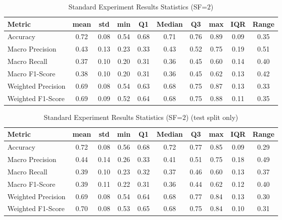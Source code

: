 \begin{table}[h]
\caption{Standard Experiment Results Statistics (SF=$2$)}
\label{tab:sf2_Standard_Results_Statistics}
\begin{tabular}{|l|c|c|c|c|c|c|c|c|c|}
\toprule
Metric & mean & std & min & Q1 & Median & Q3 & max & IQR & Range \\
\midrule
Accuracy & 0.72 & 0.08 & 0.54 & 0.68 & 0.71 & 0.76 & 0.89 & 0.09 & 0.35 \\
Macro Precision & 0.43 & 0.13 & 0.23 & 0.33 & 0.43 & 0.52 & 0.75 & 0.19 & 0.51 \\
Macro Recall & 0.37 & 0.10 & 0.20 & 0.31 & 0.36 & 0.45 & 0.60 & 0.14 & 0.40 \\
Macro F1-Score & 0.38 & 0.10 & 0.20 & 0.31 & 0.36 & 0.45 & 0.62 & 0.13 & 0.42 \\
Weighted Precision & 0.69 & 0.08 & 0.54 & 0.63 & 0.68 & 0.75 & 0.87 & 0.13 & 0.33 \\
Weighted F1-Score & 0.69 & 0.09 & 0.52 & 0.64 & 0.68 & 0.75 & 0.88 & 0.11 & 0.35 \\
\bottomrule
\end{tabular}
\end{table}

\begin{table}[h]
\caption{Standard Experiment Results Statistics (SF=$2$) (test split only)}
\label{tab:sf2_test_Standard_Results_Statistics}
\begin{tabular}{|l|c|c|c|c|c|c|c|c|c|}
\toprule
Metric & mean & std & min & Q1 & Median & Q3 & max & IQR & Range \\
\midrule
Accuracy & 0.72 & 0.08 & 0.56 & 0.68 & 0.72 & 0.77 & 0.85 & 0.09 & 0.29 \\
Macro Precision & 0.44 & 0.14 & 0.26 & 0.33 & 0.41 & 0.51 & 0.75 & 0.18 & 0.49 \\
Macro Recall & 0.39 & 0.10 & 0.23 & 0.32 & 0.37 & 0.46 & 0.60 & 0.13 & 0.37 \\
Macro F1-Score & 0.39 & 0.11 & 0.22 & 0.31 & 0.36 & 0.44 & 0.62 & 0.12 & 0.40 \\
Weighted Precision & 0.69 & 0.08 & 0.54 & 0.64 & 0.68 & 0.77 & 0.84 & 0.13 & 0.30 \\
Weighted F1-Score & 0.70 & 0.08 & 0.53 & 0.65 & 0.68 & 0.75 & 0.84 & 0.10 & 0.31 \\
\bottomrule
\end{tabular}
\end{table}